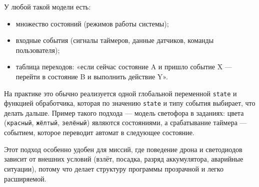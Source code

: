 У любой такой модели есть:
\begin{itemize}
    \item множество состояний (режимов работы системы);
    \item входные события (сигналы таймеров, данные датчиков, команды пользователя);
    \item таблица переходов: «если сейчас состояние A и пришло событие X — перейти в состояние B и выполнить действие Y».
\end{itemize}

На практике это обычно реализуется одной глобальной переменной \verb|state| и функцией обработчика, которая по значению \verb|state| и типу события выбирает, что делать дальше. Пример такого подхода — модель светофора в заданиях: цвета (\texttt{красный}, \texttt{жёлтый}, \texttt{зелёный}) являются состояниями, а срабатывание таймера — событием, которое переводит автомат в следующее состояние.

Этот подход особенно удобен для миссий, где поведение дрона и светодиодов зависит от внешних условий (взлёт, посадка, разряд аккумулятора, аварийные ситуации), потому что делает структуру программы прозрачной и легко расширяемой.
